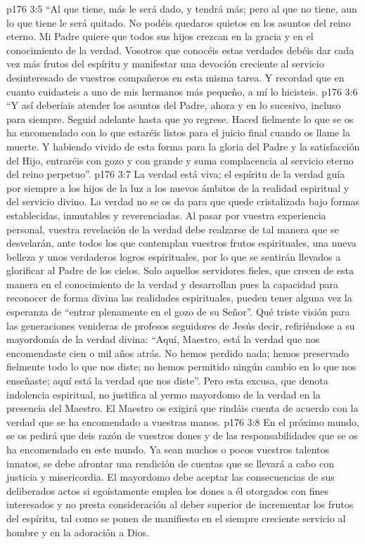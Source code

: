 \vs p176 3:5 “Al que tiene, más le será dado, y tendrá más; pero al que no tiene, aun lo que tiene le será quitado. No podéis quedaros quietos en los asuntos del reino eterno. Mi Padre quiere que todos sus hijos crezcan en la gracia y en el conocimiento de la verdad. Vosotros que conocéis estas verdades debéis dar cada vez más frutos del espíritu y manifestar una devoción creciente al servicio desinteresado de vuestros compañeros en esta misma tarea. Y recordad que en cuanto cuidasteis a uno de mis hermanos más pequeño, a mí lo hicisteis.
\vs p176 3:6 “Y así deberíais atender los asuntos del Padre, ahora y en lo sucesivo, incluso para siempre. Seguid adelante hasta que yo regrese. Haced fielmente lo que se os ha encomendado con lo que estaréis listos para el juicio final cuando os llame la muerte. Y habiendo vivido de esta forma para la gloria del Padre y la satisfacción del Hijo, entraréis con gozo y con grande y suma complacencia al servicio eterno del reino perpetuo”.
\vs p176 3:7 \pc La verdad está viva; el espíritu de la verdad guía por siempre a los hijos de la luz a los nuevos ámbitos de la realidad espiritual y del servicio divino. La verdad no se os da para que quede cristalizada bajo formas establecidas, inmutables y reverenciadas. Al pasar por vuestra experiencia personal, vuestra revelación de la verdad debe realzarse de tal manera que se desvelarán, ante todos los que contemplan vuestros frutos espirituales, una nueva belleza y unos verdaderos logros espirituales, por lo que se sentirán llevados a glorificar al Padre de los cielos. Solo aquellos servidores fieles, que crecen de esta manera en el conocimiento de la verdad y desarrollan pues la capacidad para reconocer de forma divina las realidades espirituales, pueden tener alguna vez la esperanza de “entrar plenamente en el gozo de su Señor”. Qué triste visión para las generaciones venideras de profesos seguidores de Jesús decir, refiriéndose a su mayordomía de la verdad divina: “Aquí, Maestro, está la verdad que nos encomendaste cien o mil años atrás. No hemos perdido nada; hemos preservado fielmente todo lo que nos diste; no hemos permitido ningún cambio en lo que nos enseñaste; aquí está la verdad que nos diste”. Pero esta excusa, que denota indolencia espiritual, no justifica al yermo mayordomo de la verdad en la presencia del Maestro. El Maestro os exigirá que rindáis cuenta de acuerdo con la verdad que se ha encomendado a vuestras manos.
\vs p176 3:8 En el próximo mundo, se os pedirá que deis razón de vuestros dones y de las responsabilidades que se os ha encomendado en este mundo. Ya sean muchos o pocos vuestros talentos innatos, se debe afrontar una rendición de cuentas que se llevará a cabo con justicia y misericordia. El mayordomo debe aceptar las consecuencias de sus deliberados actos si egoístamente emplea los dones a él otorgados con fines interesados y no presta consideración al deber superior de incrementar los frutos del espíritu, tal como se ponen de manifiesto en el siempre creciente servicio al hombre y en la adoración a Dios.
